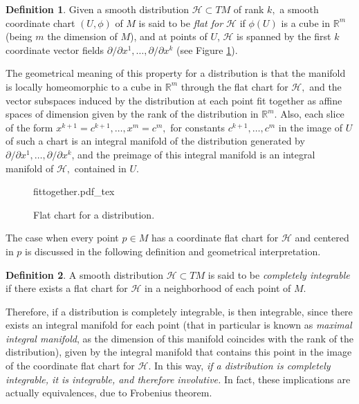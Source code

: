 \documentclass[12pt, letterpaper, reqno]{amsart}
\newcommand{\incfig}[2][1]{%
    \def\svgwidth{#1\columnwidth}
    {#2.pdf_tex}
}
\theoremstyle{definition}
\newtheorem{df}{Definition}
\theoremstyle{plain}
\theoremstyle{remark}
\begin{document}
\begin{df}
	Given a smooth distribution $ \mathcal{H}\subset TM $  of rank $ k, $ a smooth coordinate chart $ (U,\phi) $ of $ M $ is said to be \textit{flat for $ \mathcal{H} $ } if $ \phi(U) $ is a cube in $ \mathbb{R}^m  $ (being $ m $ the dimension of $ M $), and at points of $ U $, $ \mathcal{H} $ is spanned by the first $ k $ coordinate vector fields $ \partial/\partial x^1,\dots,\partial/\partial x^k $ (see Figure \ref{fig:fittogether}).
\end{df}
The geometrical meaning of this property for a distribution is that the manifold is locally homeomorphic to a cube in $ \mathbb{R}^m  $ through the flat chart for $ \mathcal{H}, $  and the vector subspaces induced by the distribution at each point fit together as affine spaces of dimension given by the rank of the distribution in $ \mathbb{R}^m $. Also, each slice of the form $ x^{k+1}=c^{k+1},\dots, x^m=c^m,$ for constants $ c^{k+1}, \dots, c^m $ in the image of $ U $ of such a chart is an integral manifold of the distribution generated by $ \partial/\partial x^1,\dots,\partial/\partial x^k $, and the preimage of this integral manifold is an integral manifold of $ \mathcal{H}, $ contained in $ U. $  

\begin{figure}
    \centering
    \incfig{fittogether}
    \caption{Flat chart for a distribution.}
    \label{fig:fittogether}
\end{figure}

The case when every point $p\in M $ has a coordinate flat chart for $ \mathcal{H} $ and centered in $ p $ is discussed in the following definition and geometrical interpretation.

\begin{df}
	A smooth distribution $ \mathcal{H}\subset TM $  is said to be \textit{completely integrable} if there exists a flat chart for $ \mathcal{H} $ in a neighborhood of each point of $ M. $ 
\end{df}

Therefore, if a distribution is completely integrable, is then integrable, since there exists an integral manifold for each point (that in particular is known as \textit{maximal integral manifold}, as the dimension of this manifold coincides with the rank of the distribution), given by the integral manifold that contains this point in the image of the coordinate flat chart for $ \mathcal{H}. $ In this way, \textit{ if a distribution is completely integrable, it is integrable, and therefore involutive.} In fact, these implications are actually equivalences, due to Frobenius theorem.
\end{document}
